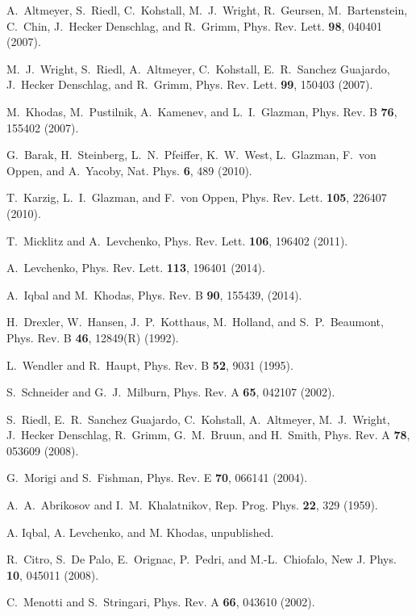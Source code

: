 \begin{thebibliography}{99}
A.~Altmeyer, S.~Riedl, C.~Kohstall, M.~J.~Wright, R.~Geursen, M.~Bartenstein, C.~Chin, J.~Hecker Denschlag, and R.~Grimm, Phys. Rev. Lett. \textbf{98}, 040401 (2007).

M.~J.~Wright, S.~Riedl, A.~Altmeyer, C.~Kohstall, E.~R.~Sanchez Guajardo, J.~Hecker Denschlag, and R.~Grimm, Phys. Rev. Lett. \textbf{99}, 150403 (2007).

M.~Khodas, M.~Pustilnik, A.~Kamenev, and L.~I.~Glazman, 
Phys. Rev. B \textbf{76}, 155402 (2007).

G.~Barak, H.~Steinberg, L.~N.~Pfeiffer, K.~W.~West, L.~Glazman,
F.~von Oppen, and A.~Yacoby, Nat. Phys. \textbf{6}, 489 (2010).

T.~Karzig, L.~I.~Glazman, and F.~von Oppen, Phys. Rev. Lett. \textbf{105}, 226407 (2010).

T.~Micklitz and A.~Levchenko, Phys. Rev. Lett. \textbf{106}, 196402 (2011).

A.~Levchenko, Phys. Rev. Lett. \textbf{113}, 196401 (2014).

A.~Iqbal and M.~Khodas, Phys. Rev. B \textbf{90}, 155439, (2014).

H.~Drexler, W.~Hansen, J.~P.~Kotthaus, M.~Holland, and S.~P.~Beaumont, 
Phys. Rev. B \textbf{46}, 12849(R) (1992).

L.~Wendler and R.~Haupt, Phys. Rev. B \textbf{52}, 9031 (1995).

S.~Schneider and G.~J.~Milburn, Phys. Rev. A \textbf{65}, 042107 (2002).

S.~Riedl, E.~R.~Sanchez Guajardo, C.~Kohstall, A.~Altmeyer, M.~J.~Wright, J.~Hecker Denschlag, R.~Grimm, G.~M.~Bruun, and H.~Smith, Phys. Rev. A \textbf{78}, 053609 (2008).

G.~Morigi and S.~Fishman, Phys. Rev. E \textbf{70}, 066141 (2004). 

A.~A.~Abrikosov and I.~M.~Khalatnikov, Rep. Prog. Phys. \textbf{22}, 329 (1959).

A. Iqbal, A. Levchenko, and M. Khodas, unpublished.

R.~Citro, S.~De Palo, E.~Orignac, P.~Pedri, and M.-L.~Chiofalo, New J. Phys. \textbf{10}, 045011 (2008).

C.~Menotti and S.~Stringari, Phys. Rev. A \textbf{66}, 043610 (2002).


\end{thebibliography}
